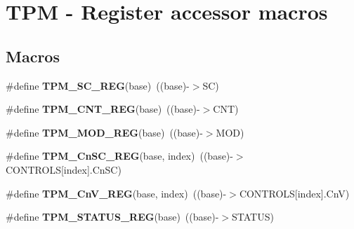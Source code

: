 \hypertarget{group___t_p_m___register___accessor___macros}{}\section{T\+PM -\/ Register accessor macros}
\label{group___t_p_m___register___accessor___macros}
\subsection*{Macros}
\begin{DoxyCompactItemize}
\item 
\mbox{\label{group___t_p_m___register___accessor___macros_ga1f49370b3669ba7395db93597d3d5c4c}} 
\#define {\bfseries T\+P\+M\+\_\+\+S\+C\+\_\+\+R\+EG}(base)~((base)-\/$>$SC)
\item 
\mbox{\label{group___t_p_m___register___accessor___macros_ga7f07766035aaf4ef8d6a789dc070bb8e}} 
\#define {\bfseries T\+P\+M\+\_\+\+C\+N\+T\+\_\+\+R\+EG}(base)~((base)-\/$>$C\+NT)
\item 
\mbox{\label{group___t_p_m___register___accessor___macros_ga549fa5a6fe75d15bb21ae1a3925047c7}} 
\#define {\bfseries T\+P\+M\+\_\+\+M\+O\+D\+\_\+\+R\+EG}(base)~((base)-\/$>$M\+OD)
\item 
\mbox{\label{group___t_p_m___register___accessor___macros_gaa96e657221c499960f64bc004e348b6c}} 
\#define {\bfseries T\+P\+M\+\_\+\+Cn\+S\+C\+\_\+\+R\+EG}(base,  index)~((base)-\/$>$C\+O\+N\+T\+R\+O\+LS\mbox{[}index\mbox{]}.Cn\+SC)
\item 
\mbox{\label{group___t_p_m___register___accessor___macros_gaf87163e32c337d1f46724110a85e8ea2}} 
\#define {\bfseries T\+P\+M\+\_\+\+Cn\+V\+\_\+\+R\+EG}(base,  index)~((base)-\/$>$C\+O\+N\+T\+R\+O\+LS\mbox{[}index\mbox{]}.CnV)
\item 
\mbox{\label{group___t_p_m___register___accessor___macros_ga685068c641303a062f9a8a0ba4f43fa2}} 
\#define {\bfseries T\+P\+M\+\_\+\+S\+T\+A\+T\+U\+S\+\_\+\+R\+EG}(base)~((base)-\/$>$S\+T\+A\+T\+US)

\end{DoxyCompactItemize}
